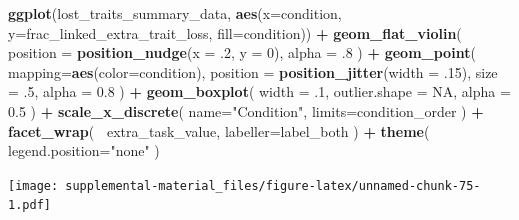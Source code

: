 \documentclass[]{book}
\newenvironment{Shaded}{\begin{snugshade}}{\end{snugshade}}
\newcommand{\DataTypeTok}[1]{\textcolor[rgb]{0.13,0.29,0.53}{#1}}
\newcommand{\DecValTok}[1]{\textcolor[rgb]{0.00,0.00,0.81}{#1}}
\newcommand{\FloatTok}[1]{\textcolor[rgb]{0.00,0.00,0.81}{#1}}
\newcommand{\KeywordTok}[1]{\textcolor[rgb]{0.13,0.29,0.53}{\textbf{#1}}}
\newcommand{\NormalTok}[1]{#1}
\newcommand{\OperatorTok}[1]{\textcolor[rgb]{0.81,0.36,0.00}{\textbf{#1}}}
\newcommand{\OtherTok}[1]{\textcolor[rgb]{0.56,0.35,0.01}{#1}}
\newcommand{\StringTok}[1]{\textcolor[rgb]{0.31,0.60,0.02}{#1}}
\begin{document}
\begin{Shaded}
\begin{Highlighting}[]
\KeywordTok{ggplot}\NormalTok{(lost_traits_summary_data, }\KeywordTok{aes}\NormalTok{(}\DataTypeTok{x=}\NormalTok{condition, }\DataTypeTok{y=}\NormalTok{frac_linked_extra_trait_loss, }\DataTypeTok{fill=}\NormalTok{condition)) }\OperatorTok{+}
\StringTok{  }\KeywordTok{geom_flat_violin}\NormalTok{(}
    \DataTypeTok{position =} \KeywordTok{position_nudge}\NormalTok{(}\DataTypeTok{x =} \FloatTok{.2}\NormalTok{, }\DataTypeTok{y =} \DecValTok{0}\NormalTok{),}
    \DataTypeTok{alpha =} \FloatTok{.8}
\NormalTok{  ) }\OperatorTok{+}
\StringTok{  }\KeywordTok{geom_point}\NormalTok{(}
    \DataTypeTok{mapping=}\KeywordTok{aes}\NormalTok{(}\DataTypeTok{color=}\NormalTok{condition),}
    \DataTypeTok{position =} \KeywordTok{position_jitter}\NormalTok{(}\DataTypeTok{width =} \FloatTok{.15}\NormalTok{),}
    \DataTypeTok{size =} \FloatTok{.5}\NormalTok{,}
    \DataTypeTok{alpha =} \FloatTok{0.8}
\NormalTok{  ) }\OperatorTok{+}
\StringTok{  }\KeywordTok{geom_boxplot}\NormalTok{(}
    \DataTypeTok{width =} \FloatTok{.1}\NormalTok{,}
    \DataTypeTok{outlier.shape =} \OtherTok{NA}\NormalTok{,}
    \DataTypeTok{alpha =} \FloatTok{0.5}
\NormalTok{  ) }\OperatorTok{+}
\StringTok{  }\KeywordTok{scale_x_discrete}\NormalTok{(}
    \DataTypeTok{name=}\StringTok{"Condition"}\NormalTok{,}
    \DataTypeTok{limits=}\NormalTok{condition_order}
\NormalTok{  ) }\OperatorTok{+}
\StringTok{  }\KeywordTok{facet_wrap}\NormalTok{(}
    \OperatorTok{~}\NormalTok{extra_task_value,}
    \DataTypeTok{labeller=}\NormalTok{label_both}
\NormalTok{  ) }\OperatorTok{+}
\StringTok{  }\KeywordTok{theme}\NormalTok{(}
    \DataTypeTok{legend.position=}\StringTok{"none"}
\NormalTok{  )}
\end{Highlighting}
\end{Shaded}

\texttt{[image: supplemental-material\_files/figure-latex/unnamed-chunk-75-1.pdf]}

\begin{Shaded}
\end{Shaded}
\end{document}
